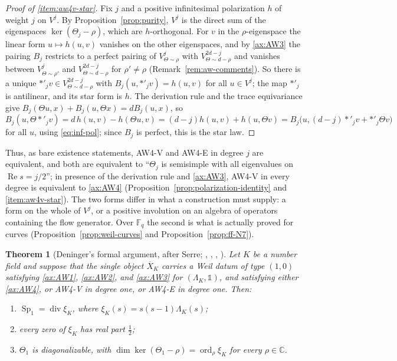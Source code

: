 \documentclass[11pt]{amsart}
\theoremstyle{plain}
\newtheorem{theorem}{Theorem}[section]
\theoremstyle{definition}
\theoremstyle{remark}
\numberwithin{equation}{section}
\newcommand{\C}{\mathbb{C}}
\newcommand{\F}{\mathbb{F}}
\newcommand{\Xbar}{\overline{X}}
\DeclareMathOperator{\divisor}{div}
\DeclareMathOperator{\Rea}{Re}
\DeclareMathOperator{\ord}{ord}
\renewcommand{\Re}{\Rea}
\begin{document}
\begin{proof}[Proof of \ref{item:aw4v-star}]
Fix $j$ and a positive infinitesimal polarization $h$ of weight
$j$ on $V^j$. By Proposition~\ref{prop:purity}, $V^j$ is the direct
sum of the eigenspaces $\ker(\Theta_j-\rho)$, which are $h$-orthogonal.
For $v$ in the $\rho$-eigenspace the linear form $u\mapsto h(u,v)$
vanishes on the other eigenspaces, and by \ref{ax:AW3} the pairing $B_j$
restricts to a perfect pairing of $V^j_{\Theta\sim\rho}$ with
$V^{2d-j}_{\Theta\sim d-\rho}$ and vanishes between
$V^j_{\Theta\sim\rho'}$ and $V^{2d-j}_{\Theta\sim d-\rho}$ for
$\rho'\ne\rho$ (Remark~\ref{rem:aw-comments}). So there is a unique
$*'_jv\in V^{2d-j}_{\Theta\sim d-\rho}$ with $B_j(u,*'_jv)=h(u,v)$ for
all $u\in V^j$; the map $*'_j$ is antilinear, and its star form is
$h$. The derivation rule and the trace equivariance give
$B_j(\Theta u,x)+B_j(u,\Theta x)=dB_j(u,x)$, so
\[
B_j(u,\Theta*'_jv)=d\,h(u,v)-h(\Theta u,v)
=(d-j)h(u,v)+h(u,\Theta v)=B_j\bigl(u,(d-j)*'_jv+*'_j\Theta v\bigr)
\]
for all $u$, using \eqref{eq:inf-pol}; since $B_j$ is perfect, this is
the star law.
\end{proof}

Thus, as bare existence statements, AW4-V and AW4-E in degree $j$ are
equivalent, and both are equivalent to ``$\Theta_j$ is semisimple with
all eigenvalues on $\Re s=j/2$''; in presence of the derivation rule
and \ref{ax:AW3}, AW4-V in every degree is equivalent to \ref{ax:AW4}
(Proposition~\ref{prop:polarization-identity} and
\ref{item:aw4v-star}). The two forms differ in what a
construction must supply: a form on the whole of $V^j$, or a positive
involution on an algebra of operators containing the flow generator.
Over $\F_q$ the second is what is actually proved for curves
(Proposition~\ref{prop:weil-curves} and
Proposition~\ref{prop:ff-N7}).

\begin{theorem}[{Deninger's formal argument, after Serre;
\cite[(7.11)--(7.13), pp.~32--33]{Deninger1994Motivic},
\cite[p.~169]{Deninger1998Analogies},
\cite[pp.~4--5]{Deninger2010HilbertPolya},
\cite[2.7, p.~3]{Deninger2022NoWeil}}]\label{thm:rh}
Let $K$ be a number field and suppose that the single object
$\Xbar_K$ carries a Weil datum of type $(1,0)$ satisfying
\ref{ax:AW1}, \ref{ax:AW2}, and \ref{ax:AW3} for
$(\Lambda_K,\mathbb 1)$, and satisfying either \ref{ax:AW4}, or AW4-V
in degree one, or AW4-E in degree one. Then:
\begin{enumerate}[label=(\roman*)]
\item\label{item:rh-divisor} $\operatorname{Sp}_1=\divisor\xi_K$, where
  $\xi_K(s)=s(s-1)\Lambda_K(s)$;
\item\label{item:rh-line} every zero of $\xi_K$ has real part
  $\tfrac12$;
\item\label{item:rh-ss} $\Theta_1$ is diagonalizable, with
  $\dim\ker(\Theta_1-\rho)=\ord_\rho\xi_K$ for every $\rho\in\C$.
\end{enumerate}
\end{theorem}
\end{document}
